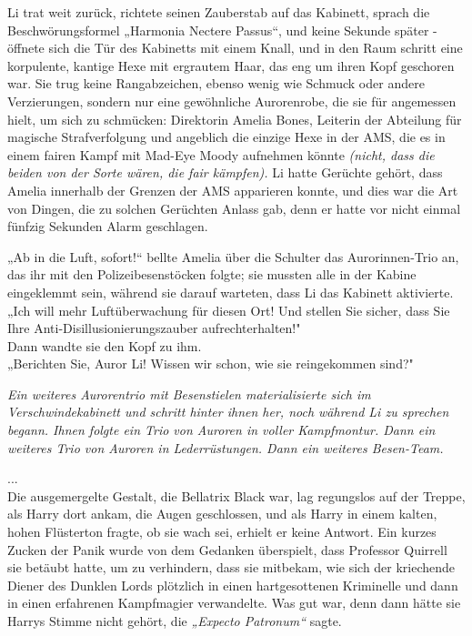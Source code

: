 {Li trat weit zurück, richtete seinen Zauberstab auf das Kabinett, sprach die Beschwörungsformel „Harmonia Nectere Passus“, und keine Sekunde später - öffnete sich die Tür des Kabinetts mit einem Knall, und in den Raum schritt eine korpulente, kantige Hexe mit ergrautem Haar, das eng um ihren Kopf geschoren war. Sie trug keine Rangabzeichen, ebenso wenig wie Schmuck oder andere Verzierungen, sondern nur eine gewöhnliche Aurorenrobe, die sie für angemessen hielt, um sich zu schmücken: Direktorin Amelia Bones, Leiterin der Abteilung für magische Strafverfolgung und angeblich die einzige Hexe in der AMS, die es in einem fairen Kampf mit Mad-Eye Moody aufnehmen könnte \emph{(nicht, dass die beiden von der Sorte wären, die fair kämpfen).} Li hatte Gerüchte gehört, dass Amelia innerhalb der Grenzen der AMS apparieren konnte, und dies war die Art von Dingen, die zu solchen Gerüchten Anlass gab, denn er hatte vor nicht einmal fünfzig Sekunden Alarm geschlagen.

„Ab in die Luft, sofort!“ bellte Amelia über die Schulter das Aurorinnen-Trio an, das ihr mit den Polizeibesenstöcken folgte; sie mussten alle in der Kabine eingeklemmt sein, während sie darauf warteten, dass Li das Kabinett aktivierte.\\ „Ich will mehr Luftüberwachung für diesen Ort! Und stellen Sie sicher, dass Sie Ihre Anti-Disillusionierungszauber aufrechterhalten!"\\ Dann wandte sie den Kopf zu ihm.\\ „Berichten Sie, Auror Li! Wissen wir schon, wie sie reingekommen sind?"

\emph{Ein weiteres Aurorentrio mit Besenstielen materialisierte sich im Verschwindekabinett und schritt hinter ihnen her, noch während Li zu sprechen begann. Ihnen folgte ein Trio von Auroren in voller Kampfmontur. Dann ein weiteres Trio von Auroren in Lederrüstungen. Dann ein weiteres Besen-Team.}

...\\ Die ausgemergelte Gestalt, die Bellatrix Black war, lag regungslos auf der Treppe, als Harry dort ankam, die Augen geschlossen, und als Harry in einem kalten, hohen Flüsterton fragte, ob sie wach sei, erhielt er keine Antwort. Ein kurzes Zucken der Panik wurde von dem Gedanken überspielt, dass Professor Quirrell sie betäubt hatte, um zu verhindern, dass sie mitbekam, wie sich der kriechende Diener des Dunklen Lords plötzlich in einen hartgesottenen Kriminelle und dann in einen erfahrenen Kampfmagier verwandelte. Was gut war, denn dann hätte sie Harrys Stimme nicht gehört, die \emph{„Expecto Patronum“} sagte.

}
